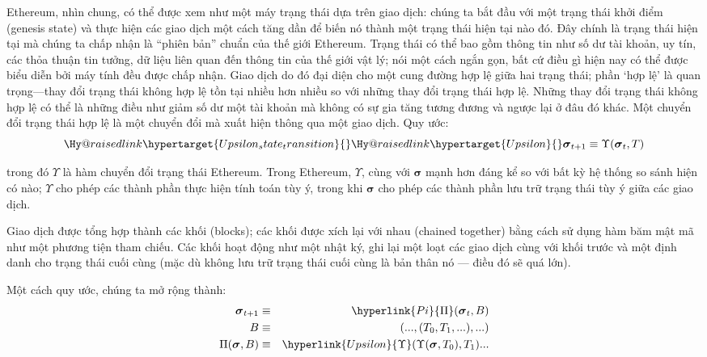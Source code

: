 \documentclass[9pt,oneside]{amsart}
\makeatletter
\newcommand{\linkdest}[1]{\Hy@raisedlink{\hypertarget{#1}{}}}
\makeatother
\begin{document}
\begin{multicols}{2}
Ethereum, nhìn chung, có thể được xem như một máy trạng thái dựa trên giao dịch: chúng ta bắt đầu với một trạng thái khởi điểm (genesis state) và thực hiện các giao dịch một cách tăng dần để biến nó thành một trạng thái hiện tại nào đó. Đây chính là trạng thái hiện tại mà chúng ta chấp nhận là ``phiên bản'' chuẩn của thế giới Ethereum. Trạng thái có thể bao gồm thông tin như số dư tài khoản, uy tín, các thỏa thuận tin tưởng, dữ liệu liên quan đến thông tin của thế giới vật lý; nói một cách ngắn gọn, bất cứ điều gì hiện nay có thể được biểu diễn bởi máy tính đều được chấp nhận. Giao dịch do đó đại diện cho một cung đường hợp lệ giữa hai trạng thái; phần `hợp lệ' là quan trọng—thay đổi trạng thái không hợp lệ tồn tại nhiều hơn nhiều so với những thay đổi trạng thái hợp lệ. Những thay đổi trạng thái không hợp lệ có thể là những điều như giảm số dư một tài khoản mà không có sự gia tăng tương đương và ngược lại ở đâu đó khác. Một chuyển đổi trạng thái hợp lệ là một chuyển đổi mà xuất hiện thông qua một giao dịch. Quy ước:
\begin{equation}
\linkdest{Upsilon_state_transition}\linkdest{Upsilon}\boldsymbol{\sigma}_{t+1} \equiv \Upsilon(\boldsymbol{\sigma}_{t}, T)
\end{equation}

trong đó $\Upsilon$ là hàm chuyển đổi trạng thái Ethereum. Trong Ethereum, $\Upsilon$, cùng với $\boldsymbol{\sigma}$ mạnh hơn đáng kể so với bất kỳ hệ thống so sánh hiện có nào; $\Upsilon$ cho phép các thành phần thực hiện tính toán tùy ý, trong khi $\boldsymbol{\sigma}$ cho phép các thành phần lưu trữ trạng thái tùy ý giữa các giao dịch.

Giao dịch được tổng hợp thành các khối (blocks); các khối được xích lại với nhau (chained together) bằng cách sử dụng hàm băm mật mã như một phương tiện tham chiếu. Các khối hoạt động như một nhật ký, ghi lại một loạt các giao dịch cùng với khối trước và một định danh cho trạng thái cuối cùng (mặc dù không lưu trữ trạng thái cuối cùng là bản thân nó --- điều đó sẽ quá lớn).

Một cách quy ước, chúng ta mở rộng thành:
\begin{eqnarray}
\boldsymbol{\sigma}_{t+1} & \equiv & \hyperlink{Pi}{\Pi}(\boldsymbol{\sigma}_{t}, B) \\
B & \equiv & (..., (T_0, T_1, ...), ...) \\
\Pi(\boldsymbol{\sigma}, B) & \equiv & \hyperlink{Upsilon}{\Upsilon}(\Upsilon(\boldsymbol{\sigma}, T_0), T_1) ...
\end{eqnarray}


\end{multicols}
\end{document}
